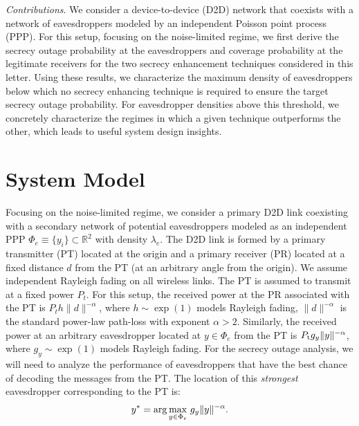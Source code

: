 \documentclass[final]{IEEEtran}
\begin{document}
\textit{Contributions}. We consider a device-to-device (D2D) network that coexists with a network of eavesdroppers modeled by an independent Poisson point process (PPP). For this setup, focusing on the noise-limited regime, we first derive the secrecy outage probability at the eavesdroppers and coverage probability at the legitimate receivers for the two secrecy enhancement techniques considered in this letter. Using these results, we characterize the maximum density of eavesdroppers below which no secrecy enhancing technique is required to ensure the target secrecy outage probability. For eavesdropper densities above this threshold, we concretely characterize the regimes in which a given technique outperforms the other, which leads to useful system design insights.%
\vspace{-3mm}
\section{System Model} \label{sec:SysMod}
Focusing on the noise-limited regime, we consider a primary D2D link coexisting with a secondary network of potential eavesdroppers modeled as an independent PPP $\Phi_{e}\equiv\{y_{i}\}\subset\mathbb{R}^2$ with density $\lambda_{e}$. The D2D link is formed by a primary transmitter (PT) located at the origin and a primary receiver (PR) located at a fixed distance $d$ from the PT (at an arbitrary angle from the origin). We assume independent Rayleigh fading on all wireless links. The PT is assumed to transmit at a fixed power $P_{t}$. For this setup, the received power at the PR associated with the PT is $P_{t}h\|d\|^{-\alpha}$, where $h\sim \exp(1)$ models Rayleigh fading, $\|d\|^{-\alpha}$ is the standard power-law path-loss with exponent $\alpha > 2$. Similarly, the received power at an arbitrary eavesdropper located at $y \in \Phi_{e}$ from the PT is $P_{\rm t}g_{y}\|y\|^{-\alpha}$, where $g_{y}\sim \exp(1)$ models Rayleigh fading. For the secrecy outage analysis, we will need to analyze the performance of eavesdroppers that have the best chance of decoding the messages from the PT.  The location of this {\em strongest} eavesdropper corresponding to the PT is:
\begin{align}
\label{1}
{\small y^*=\arg\underset{y\in\Phi_{e}}{\max}\ g_{y}\|y\|^{-\alpha}}.
\end{align}   
\end{document}
